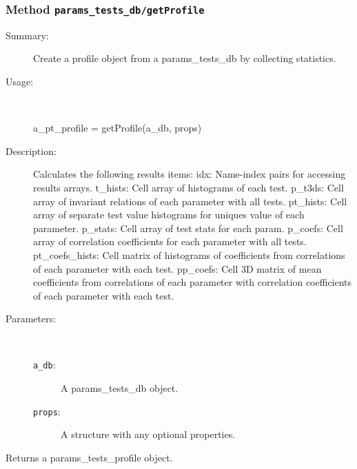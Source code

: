 \subsubsection[Method \texttt{getProfile}]{Method \texttt{params\_tests\_db/getProfile}}%
%
\label{ref_params_tests_db__getProfile}%
\hypertarget{ref_params_tests_db__getProfile}{}%
\begin{description}
\item[Summary:]Create a profile object from a params\_tests\_db by collecting
			 statistics.
%
\item[Usage:]~%
\begin{lyxcode}%
a\_pt\_profile = getProfile(a\_db, props)
%
\end{lyxcode}%
%
\item[Description:]%
Calculates the following results items:
	idx: Name-index pairs for accessing results arrays.
	t\_hists: Cell array of histograms of each test.
	p\_t3ds: Cell array of invariant relations of each parameter with all tests.
	pt\_hists: Cell array of separate test value histograms 
		for uniques value of each parameter.
	p\_stats: Cell array of test stats for each param.
	p\_coefs: Cell array of correlation coefficients 
		for each parameter with all tests.
	pt\_coefs\_hists: Cell matrix of histograms of coefficients from 
		correlations of each parameter with each test.
	pp\_coefs: Cell 3D matrix of mean coefficients from 
		correlations of each parameter with correlation 
		coefficients of each parameter with each test.		
\item[Parameters:]~
\begin{description}%
\item[\texttt{a\_db}:]
 A params\_tests\_db object.
\item[\texttt{props}:]
 A structure with any optional properties.
\end{description}%
%
\item[Returns a params\_tests\_profile object.]~


\end{description}
